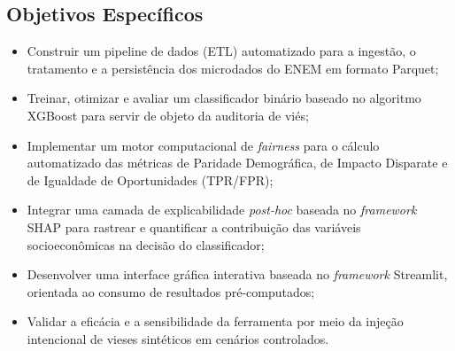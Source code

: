 \subsection{Objetivos Específicos}
\begin{itemize}
    \item Construir um pipeline de dados (ETL) automatizado para a ingestão, o tratamento e a persistência dos microdados do ENEM em formato Parquet;
    \item Treinar, otimizar e avaliar um classificador binário baseado no algoritmo XGBoost para servir de objeto da auditoria de viés;
    \item Implementar um motor computacional de \textit{fairness} para o cálculo automatizado das métricas de Paridade Demográfica, de Impacto Disparate e de Igualdade de Oportunidades (TPR/FPR);
    \item Integrar uma camada de explicabilidade \textit{post-hoc} baseada no \textit{framework} SHAP para rastrear e quantificar a contribuição das variáveis socioeconômicas na decisão do classificador;
    \item Desenvolver uma interface gráfica interativa baseada no \textit{framework} Streamlit, orientada ao consumo de resultados pré-computados;
    \item Validar a eficácia e a sensibilidade da ferramenta por meio da injeção intencional de vieses sintéticos em cenários controlados.
\end{itemize}

